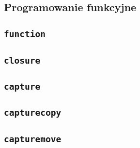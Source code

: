 \subsection{Programowanie funkcyjne}
\label{viua_vm_ops_functional}

\subsection{\texttt{function}}
\subsection{\texttt{closure}}
\subsection{\texttt{capture}}
\subsection{\texttt{capturecopy}}
\subsection{\texttt{capturemove}}
